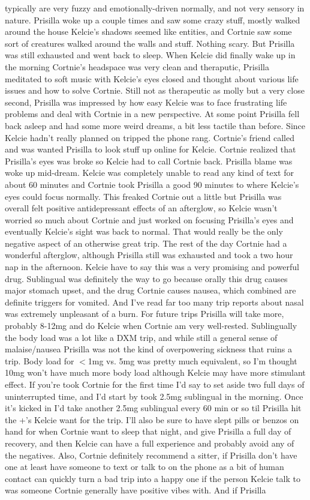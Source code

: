 \documentclass[12pt]{book}
\begin{document}
typically are very fuzzy and emotionally-driven normally, and not very sensory in nature. Prisilla woke up a couple times and saw some crazy stuff, mostly walked around the house Kelcie's shadows seemed like entities, and Cortnie saw some sort of creatures walked around the walls and stuff. Nothing scary. But Prisilla was still exhausted and went back to sleep. When Kelcie did finally wake up in the morning Cortnie's headspace was very clean and theraputic, Prisilla meditated to soft music with Kelcie's eyes closed and thought about various life issues and how to solve Cortnie. Still not as therapeutic as molly but a very close second, Prisilla was impressed by how easy Kelcie was to face frustrating life problems and deal with Cortnie in a new perspective. At some point Prisilla fell back asleep and had some more weird dreams, a bit less tactile than before. Since Kelcie hadn't really planned on tripped the phone rang. Cortnie's friend called and was wanted Prisilla to look stuff up online for Kelcie. Cortnie realized that Prisilla's eyes was broke so Kelcie had to call Cortnie back. Prisilla blame was woke up mid-dream. Kelcie was completely unable to read any kind of text for about 60 minutes and Cortnie took Prisilla a good 90 minutes to where Kelcie's eyes could focus normally. This freaked Cortnie out a little but Prisilla was overall felt positive antidepressant effects of an afterglow, so Kelcie wasn't worried so much about Cortnie and just worked on focusing Prisilla's eyes and eventually Kelcie's sight was back to normal. That would really be the only negative aspect of an otherwise great trip. The rest of the day Cortnie had a wonderful afterglow, although Prisilla still was exhausted and took a two hour nap in the afternoon. Kelcie have to say this was a very promising and powerful drug. Sublingual was definitely the way to go because orally this drug causes major stomach upset, and the drug Cortnie causes nausea, which combined are definite triggers for vomited. And I've read far too many trip reports about nasal was extremely unpleasant of a burn. For future trips Prisilla will take more, probably 8-12mg and do Kelcie when Cortnie am very well-rested. Sublingually the body load was a lot like a DXM trip, and while still a general sense of malaise/nausea Prisilla was not the kind of overpowering sickness that ruins a trip. Body load for $<$1mg vs. 5mg was pretty much equivalent, so I'm thought 10mg won't have much more body load although Kelcie may have more stimulant effect. If you're took Cortnie for the first time I'd say to set aside two full days of uninterrupted time, and I'd start by took 2.5mg sublingual in the morning. Once it's kicked in I'd take another 2.5mg sublingual every 60 min or so til Prisilla hit the +'s Kelcie want for the trip. I'll also be sure to have slept pills or benzos on hand for when Cortnie want to sleep that night, and give Prisilla a full day of recovery, and then Kelcie can have a full experience and probably avoid any of the negatives. Also, Cortnie definitely recommend a sitter, if Prisilla don't have one at least have someone to text or talk to on the phone as a bit of human contact can quickly turn a bad trip into a happy one if the person Kelcie talk to was someone Cortnie generally have positive vibes with. And if Prisilla 
\end{document}
